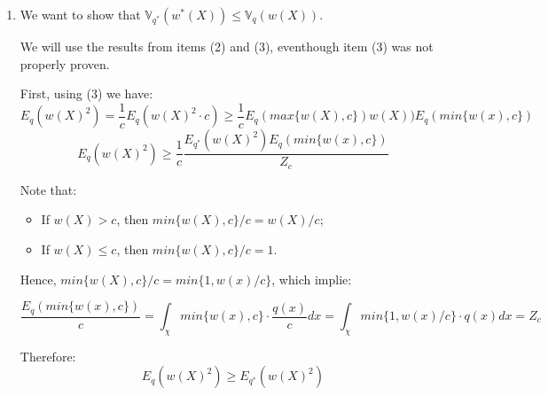 \documentclass[12pt,letterpaper]{article}
\begin{document}
\begin{enumerate}[leftmargin=!,labelindent=5pt]
	\item 
	We want to show that
	$\mathbb V_{q^*} (w^*(X)) \leq \mathbb V_q(w(X))$.

	We will use the results from items (2) and (3), eventhough
	item (3) was not properly proven.

	First, using (3) we have:
	$$ E_q(w(X)^2) = \frac{1}{c}E_q(w(X)^2\cdot c)
	\geq \frac{1}{c}E_{q}(max\{ w(X), c\})w(X))E_q(min\{w(x),c\})$$
	$$ E_q(w(X)^2) \geq
	\frac{1}{c} \frac{E_{q^*}(w(X)^2)E_q(min\{w(x),c\})}{Z_c}$$

	Note that:
	\begin{itemize}
		\item If $w(X) > c$, then $min\{w(X),c\}/c = w(X)/c$;
		\item If $w(X) \leq c$, then $min\{w(X),c\}/c = 1$.
	\end{itemize}
	Hence, $min\{w(X),c\}/c = min\{1,w(x)/c\}$, which implie:

	$$ \frac{E_q(min\{w(x),c\})}{c} =
	\int_\chi min\{w(x),c\} \cdot \frac{q(x)}{c}dx = 
	\int_\chi min\{1,w(x)/c\} \cdot q(x)dx = Z_c
	$$

	Therefore:
	$$ E_q(w(X)^2) \geq
	E_{q^*}(w(X)^2)$$

\end{enumerate}

\newpage
\end{document}
